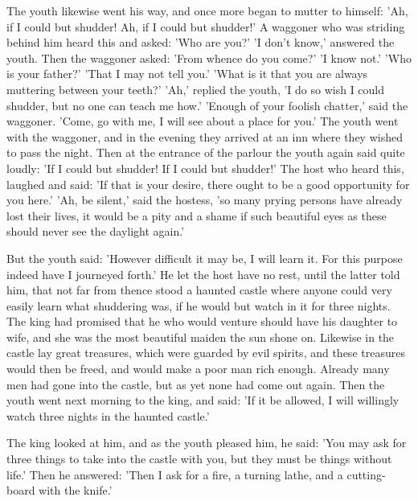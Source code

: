 \documentclass[12pt]{book}
\begin{document}
The youth likewise went his way, and once more began to mutter to
himself: 'Ah, if I could but shudder! Ah, if I could but shudder!' A
waggoner who was striding behind him heard this and asked: 'Who are
you?' 'I don't know,' answered the youth. Then the waggoner asked:
'From whence do you come?' 'I know not.' 'Who is your father?' 'That I
may not tell you.' 'What is it that you are always muttering between
your teeth?' 'Ah,' replied the youth, 'I do so wish I could shudder,
but no one can teach me how.' 'Enough of your foolish chatter,' said
the waggoner. 'Come, go with me, I will see about a place for you.'
The youth went with the waggoner, and in the evening they arrived at
an inn where they wished to pass the night. Then at the entrance of
the parlour the youth again said quite loudly: 'If I could but
shudder! If I could but shudder!' The host who heard this, laughed and
said: 'If that is your desire, there ought to be a good opportunity
for you here.' 'Ah, be silent,' said the hostess, 'so many prying
persons have already lost their lives, it would be a pity and a shame
if such beautiful eyes as these should never see the daylight again.'

But the youth said: 'However difficult it may be, I will learn it. For
this purpose indeed have I journeyed forth.' He let the host have no
rest, until the latter told him, that not far from thence stood a
haunted castle where anyone could very easily learn what shuddering
was, if he would but watch in it for three nights. The king had
promised that he who would venture should have his daughter to wife,
and she was the most beautiful maiden the sun shone on. Likewise in
the castle lay great treasures, which were guarded by evil spirits,
and these treasures would then be freed, and would make a poor man
rich enough. Already many men had gone into the castle, but as yet
none had come out again. Then the youth went next morning to the king,
and said: 'If it be allowed, I will willingly watch three nights in
the haunted castle.'

The king looked at him, and as the youth pleased him, he said: 'You
may ask for three things to take into the castle with you, but they
must be things without life.' Then he answered: 'Then I ask for a
fire, a turning lathe, and a cutting-board with the knife.'
\end{document}
